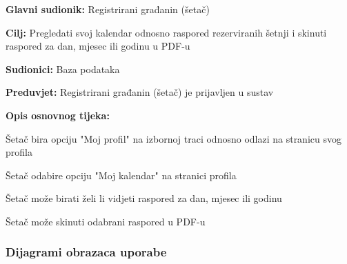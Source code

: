 	\noindent {}
	\begin{packed_item}
		
		\item \textbf{Glavni sudionik:} Registrirani građanin (šetač)
		\item  \textbf{Cilj:} Pregledati svoj kalendar odnosno raspored rezerviranih šetnji i skinuti raspored za dan, mjesec ili godinu u PDF-u
		\item  \textbf{Sudionici:} Baza podataka
		\item  \textbf{Preduvjet:} Registrirani građanin (šetač) je prijavljen u sustav
		\item  \textbf{Opis osnovnog tijeka:}
		
		\item[] \begin{packed_enum}
			\item Šetač bira opciju "Moj profil" na izbornoj traci odnosno odlazi na stranicu svog profila
			\item Šetač odabire opciju "Moj kalendar" na stranici profila
			\item Šetač može birati želi li vidjeti raspored za dan, mjesec ili godinu
			\item Šetač može skinuti odabrani raspored u PDF-u
		\end{packed_enum}
	\end{packed_item}
		

		\subsubsection{Dijagrami obrazaca uporabe}
				
